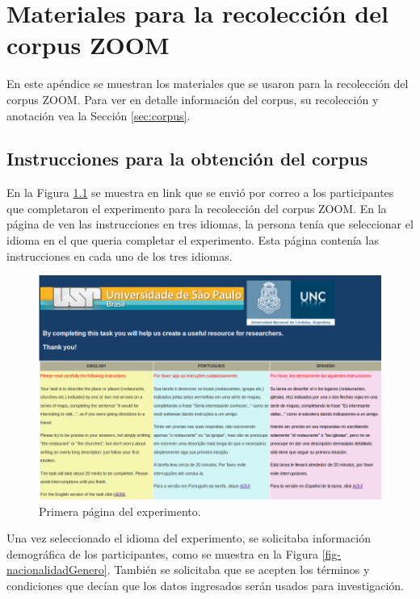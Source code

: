\appendix

\chapter{Materiales para la recolecci\'on del corpus ZOOM}\label{apendiceA}

En este ap\'endice se muestran los materiales que se usaron para la recolecci\'on del corpus ZOOM. Para ver en detalle informaci\'on del corpus, su recolecci\'on y anotaci\'on vea la Secci\'on \ref{sec:corpus}.

\section{Instrucciones para la obtenci\'on del corpus}
\label{corpus-apendice}

En la Figura \ref{fig-pagPrincipal} se muestra en link que se envi\'o por correo a los participantes que completaron el experimento para la recolecci\'on del corpus ZOOM. En la p\'agina de ven las instrucciones en tres idiomas, la persona ten\'ia que seleccionar el idioma en el que queria completar el experimento. Esta p\'agina conten\'ia las instrucciones en cada uno de los tres idiomas.

\begin{figure}[h]
\begin{center}
\includegraphics[width=\textwidth]{images/pagPrincipal.png}
\caption{Primera p\'agina del experimento.}
\label{fig-pagPrincipal}
\end{center}
\end{figure}

Una vez seleccionado el idioma del experimento, se solicitaba informaci\'on demogr\'afica de los participantes, como se muestra en la Figura \ref{fig-nacionalidadGenero}. Tambi\'en se solicitaba que se acepten los t\'erminos y condiciones que dec\'ian que los datos ingresados ser\'an usados para investigaci\'on.

